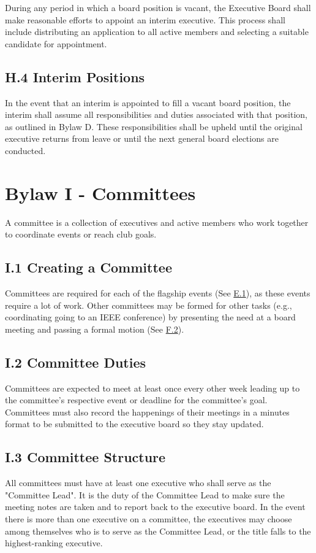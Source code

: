 \documentclass[11pt,a4paper]{article}
\begin{document}
During any period in which a board position is vacant, the Executive Board shall make reasonable efforts to appoint an interim executive. This process shall include distributing an application to all active members and selecting a suitable candidate for appointment.

\subsection*{H.4 Interim Positions}
In the event that an interim is appointed to fill a vacant board position, the interim shall assume all responsibilities and duties associated with that position, as outlined in Bylaw D. These responsibilities shall be upheld until the original executive returns from leave or until the next general board elections are conducted.

\section*{Bylaw I - Committees}
\label{I}

A committee is a collection of executives and active members who work together to coordinate events or reach club goals.

\subsection*{I.1 Creating a Committee}
Committees are required for each of the flagship events (See \hyperref[E.1]{E.1}), as these events require a lot of work. Other committees may be formed for other tasks (e.g., coordinating going to an IEEE conference) by presenting the need at a board meeting and passing a formal motion (See \hyperref[F.2]{F.2}).

\subsection*{I.2 Committee Duties}
Committees are expected to meet at least once every other week leading up to the committee's respective event or deadline for the committee's goal. Committees must also record the happenings of their meetings in a minutes format to be submitted to the executive board so they stay updated.

\subsection*{I.3 Committee Structure}
All committees must have at least one executive who shall serve as the "Committee Lead". It is the duty of the Committee Lead to make sure the meeting notes are taken and to report back to the executive board. In the event there is more than one executive on a committee, the executives may choose among themselves who is to serve as the Committee Lead, or the title falls to the highest-ranking executive.
\end{document}
